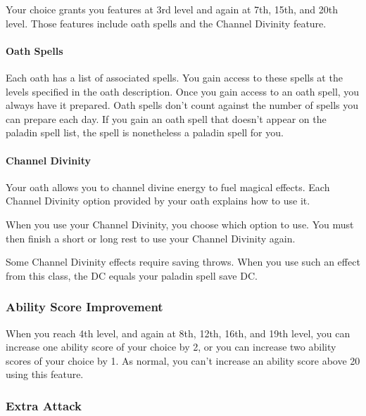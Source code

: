 \documentclass[
]{article}
\begin{document}
Your choice grants you features at 3rd level and again at 7th, 15th, and
20th level. Those features include oath spells and the Channel Divinity
feature.

\hypertarget{oath-spells}{%
\paragraph{Oath Spells}\label{oath-spells}}

Each oath has a list of associated spells. You gain access to these
spells at the levels specified in the oath description. Once you gain
access to an oath spell, you always have it prepared. Oath spells don't
count against the number of spells you can prepare each day. If you gain
an oath spell that doesn't appear on the paladin spell list, the spell
is nonetheless a paladin spell for you.

\hypertarget{channel-divinity}{%
\paragraph{Channel Divinity}\label{channel-divinity}}

Your oath allows you to channel divine energy to fuel magical effects.
Each Channel Divinity option provided by your oath explains how to use
it.

When you use your Channel Divinity, you choose which option to use. You
must then finish a short or long rest to use your Channel Divinity
again.

Some Channel Divinity effects require saving throws. When you use such
an effect from this class, the DC equals your paladin spell save DC.

\hypertarget{ability-score-improvement}{%
\subsubsection{Ability Score
Improvement}\label{ability-score-improvement}}

When you reach 4th level, and again at 8th, 12th, 16th, and 19th level,
you can increase one ability score of your choice by 2, or you can
increase two ability scores of your choice by 1. As normal, you can't
increase an ability score above 20 using this feature.

\hypertarget{extra-attack}{%
\subsubsection{Extra Attack}\label{extra-attack}}
\end{document}
